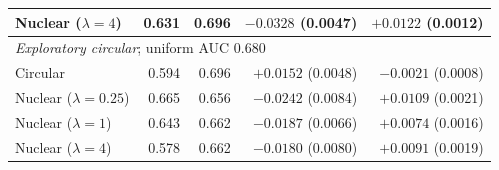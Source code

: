 \begin{tabular}{lrrrr}
Nuclear ($\lambda=4$) & 0.631 & 0.696 & $-0.0328$ (0.0047) & $+0.0122$ (0.0012) \\
\midrule
\multicolumn{5}{l}{\textit{Exploratory circular}; uniform AUC 0.680} \\
Circular & 0.594 & 0.696 & $+0.0152$ (0.0048) & $-0.0021$ (0.0008) \\
Nuclear ($\lambda=0.25$) & 0.665 & 0.656 & $-0.0242$ (0.0084) & $+0.0109$ (0.0021) \\
Nuclear ($\lambda=1$) & 0.643 & 0.662 & $-0.0187$ (0.0066) & $+0.0074$ (0.0016) \\
Nuclear ($\lambda=4$) & 0.578 & 0.662 & $-0.0180$ (0.0080) & $+0.0091$ (0.0019) \\
\bottomrule
\end{tabular}
